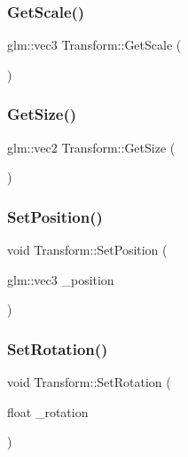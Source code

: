 \subsubsection{\texorpdfstring{Get\+Scale()}{GetScale()}}
{\footnotesize\ttfamily glm\+::vec3 Transform\+::\+Get\+Scale (\begin{DoxyParamCaption}{ }\end{DoxyParamCaption})\hspace{0.3cm}{\ttfamily [inline]}}

\mbox{\label{class_transform_a9042f2b38daaaf48b807b648e9adccbd}} 
\subsubsection{\texorpdfstring{Get\+Size()}{GetSize()}}
{\footnotesize\ttfamily glm\+::vec2 Transform\+::\+Get\+Size (\begin{DoxyParamCaption}{ }\end{DoxyParamCaption})\hspace{0.3cm}{\ttfamily [inline]}}

\mbox{\label{class_transform_ae6273120a938b99bbec52900770e6935}} 
\subsubsection{\texorpdfstring{Set\+Position()}{SetPosition()}}
{\footnotesize\ttfamily void Transform\+::\+Set\+Position (\begin{DoxyParamCaption}\item[{glm\+::vec3}]{\+\_\+position }\end{DoxyParamCaption})}

\mbox{\label{class_transform_afee469d2dba032aab48471a0a0a42c5c}} 
\subsubsection{\texorpdfstring{Set\+Rotation()}{SetRotation()}}
{\footnotesize\ttfamily void Transform\+::\+Set\+Rotation (\begin{DoxyParamCaption}\item[{float}]{\+\_\+rotation }\end{DoxyParamCaption})}

